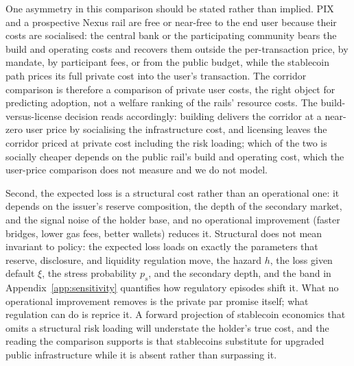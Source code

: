 One asymmetry in this comparison should be stated rather than implied. PIX and a prospective Nexus rail are free or near-free to the end user because their costs are socialised: the central bank or the participating community bears the build and operating costs and recovers them outside the per-transaction price, by mandate, by participant fees, or from the public budget, while the stablecoin path prices its full private cost into the user's transaction. The corridor comparison is therefore a comparison of private user costs, the right object for predicting adoption, not a welfare ranking of the rails' resource costs. The build-versus-license decision reads accordingly: building delivers the corridor at a near-zero user price by socialising the infrastructure cost, and licensing leaves the corridor priced at private cost including the risk loading; which of the two is socially cheaper depends on the public rail's build and operating cost, which the user-price comparison does not measure and we do not model.

Second, the expected loss is a structural cost rather than an operational one: it depends on the issuer's reserve composition, the depth of the secondary market, and the signal noise of the holder base, and no operational improvement (faster bridges, lower gas fees, better wallets) reduces it. Structural does not mean invariant to policy: the expected loss loads on exactly the parameters that reserve, disclosure, and liquidity regulation move, the hazard $h$, the loss given default $\xi$, the stress probability $p_s$, and the secondary depth, and the band in Appendix~\ref{app:sensitivity} quantifies how regulatory episodes shift it. What no operational improvement removes is the private par promise itself; what regulation can do is reprice it. A forward projection of stablecoin economics that omits a structural risk loading will understate the holder's true cost, and the reading the comparison supports is that stablecoins substitute for upgraded public infrastructure while it is absent rather than surpassing it.
